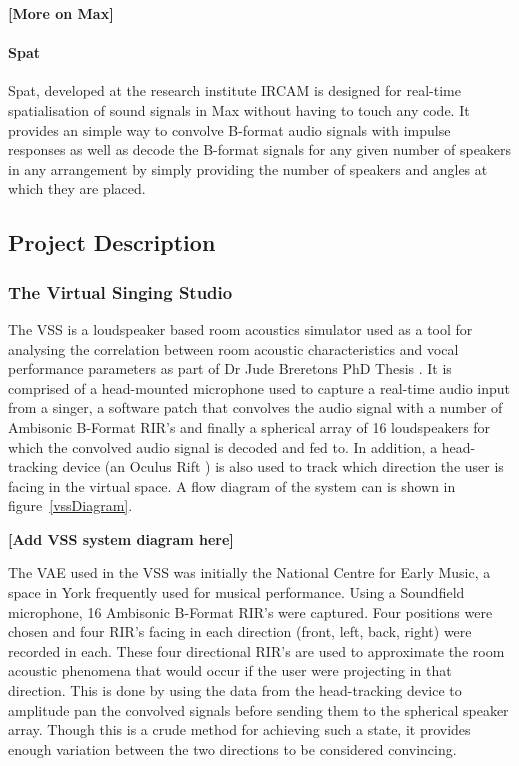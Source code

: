 \documentclass[../../main.tex]{subfiles}
\begin{document}
		\begin{center}
			\textbf{[More on Max]}
		\end{center}

		\paragraph{Spat}

			 Spat, developed at the research institute IRCAM \cite{spat} is designed for real-time spatialisation of sound signals in Max without having to touch any code. It provides an simple way to convolve B-format audio signals with impulse responses as well as decode the B-format signals for any given number of speakers in any arrangement by simply providing the number of speakers and angles at which they are placed.

\subsection{Project Description}
	\subsubsection{The Virtual Singing Studio}

		The \ac{VSS} is a loudspeaker based room acoustics simulator used as a tool for analysing the correlation between room acoustic characteristics and vocal performance parameters as part of Dr Jude Breretons PhD Thesis \cite{Brereton2014}. It is comprised of a head-mounted microphone used to capture a real-time audio input from a singer, a software patch that convolves the audio signal with a number of Ambisonic B-Format \ac{RIR}'s and finally a spherical array of 16 loudspeakers for which the convolved audio signal is decoded and fed to. In addition, a head-tracking device (an Oculus Rift \cite{oculus}) is also used to track which direction the user is facing in the virtual space. A flow diagram of the system can is shown in figure~\ref{vssDiagram}.

		\begin{center}
			\textbf{[Add VSS system diagram here]}
		\end{center}

		The \ac{VAE} used in the \ac{VSS} was initially the National Centre for Early Music, a space in York frequently used for musical performance. Using a Soundfield microphone, 16 Ambisonic B-Format \ac{RIR}'s were captured. Four positions were chosen and four \ac{RIR}'s facing in each direction (front, left, back, right) were recorded in each. These four directional \ac{RIR}'s are used to approximate the room acoustic phenomena that would occur if the user were projecting in that direction. This is done by using the data from the head-tracking device to amplitude pan the convolved signals before sending them to the spherical speaker array. Though this is a crude method for achieving such a state, it provides enough variation between the two directions to be considered convincing.
\end{document}
